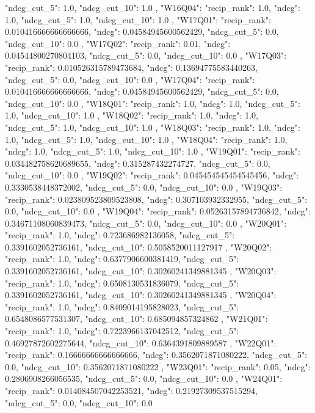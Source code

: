 {{  "ndcg_cut_5": 1.0,
  "ndcg_cut_10": 1.0
 },
 "W16Q04": {
  "recip_rank": 1.0,
  "ndcg": 1.0,
  "ndcg_cut_5": 1.0,
  "ndcg_cut_10": 1.0
 },
 "W17Q01": {
  "recip_rank": 0.010416666666666666,
  "ndcg": 0.04584945600562429,
  "ndcg_cut_5": 0.0,
  "ndcg_cut_10": 0.0
 },
 "W17Q02": {
  "recip_rank": 0.01,
  "ndcg": 0.04544800270804103,
  "ndcg_cut_5": 0.0,
  "ndcg_cut_10": 0.0
 },
 "W17Q03": {
  "recip_rank": 0.010526315789473684,
  "ndcg": 0.13694775583440263,
  "ndcg_cut_5": 0.0,
  "ndcg_cut_10": 0.0
 },
 "W17Q04": {
  "recip_rank": 0.010416666666666666,
  "ndcg": 0.04584945600562429,
  "ndcg_cut_5": 0.0,
  "ndcg_cut_10": 0.0
 },
 "W18Q01": {
  "recip_rank": 1.0,
  "ndcg": 1.0,
  "ndcg_cut_5": 1.0,
  "ndcg_cut_10": 1.0
 },
 "W18Q02": {
  "recip_rank": 1.0,
  "ndcg": 1.0,
  "ndcg_cut_5": 1.0,
  "ndcg_cut_10": 1.0
 },
 "W18Q03": {
  "recip_rank": 1.0,
  "ndcg": 1.0,
  "ndcg_cut_5": 1.0,
  "ndcg_cut_10": 1.0
 },
 "W18Q04": {
  "recip_rank": 1.0,
  "ndcg": 1.0,
  "ndcg_cut_5": 1.0,
  "ndcg_cut_10": 1.0
 },
 "W19Q01": {
  "recip_rank": 0.034482758620689655,
  "ndcg": 0.315287432274727,
  "ndcg_cut_5": 0.0,
  "ndcg_cut_10": 0.0
 },
 "W19Q02": {
  "recip_rank": 0.045454545454545456,
  "ndcg": 0.3330538448372002,
  "ndcg_cut_5": 0.0,
  "ndcg_cut_10": 0.0
 },
 "W19Q03": {
  "recip_rank": 0.023809523809523808,
  "ndcg": 0.307103932332955,
  "ndcg_cut_5": 0.0,
  "ndcg_cut_10": 0.0
 },
 "W19Q04": {
  "recip_rank": 0.05263157894736842,
  "ndcg": 0.34671108060839473,
  "ndcg_cut_5": 0.0,
  "ndcg_cut_10": 0.0
 },
 "W20Q01": {
  "recip_rank": 1.0,
  "ndcg": 0.723686982136058,
  "ndcg_cut_5": 0.3391602052736161,
  "ndcg_cut_10": 0.5058520011127917
 },
 "W20Q02": {
  "recip_rank": 1.0,
  "ndcg": 0.6377906600381419,
  "ndcg_cut_5": 0.3391602052736161,
  "ndcg_cut_10": 0.30260241349881345
 },
 "W20Q03": {
  "recip_rank": 1.0,
  "ndcg": 0.6508130531836079,
  "ndcg_cut_5": 0.3391602052736161,
  "ndcg_cut_10": 0.30260241349881345
 },
 "W20Q04": {
  "recip_rank": 1.0,
  "ndcg": 0.8409014195828023,
  "ndcg_cut_5": 0.6548086577531307,
  "ndcg_cut_10": 0.685094857324862
 },
 "W21Q01": {
  "recip_rank": 1.0,
  "ndcg": 0.7223966137042512,
  "ndcg_cut_5": 0.46927872602275644,
  "ndcg_cut_10": 0.6364391809889587
 },
 "W22Q01": {
  "recip_rank": 0.16666666666666666,
  "ndcg": 0.3562071871080222,
  "ndcg_cut_5": 0.0,
  "ndcg_cut_10": 0.3562071871080222
 },
 "W23Q01": {
  "recip_rank": 0.05,
  "ndcg": 0.2806908266056535,
  "ndcg_cut_5": 0.0,
  "ndcg_cut_10": 0.0
 },
 "W24Q01": {
  "recip_rank": 0.014084507042253521,
  "ndcg": 0.21927309537515294,
  "ndcg_cut_5": 0.0,
  "ndcg_cut_10": 0.0
}}

